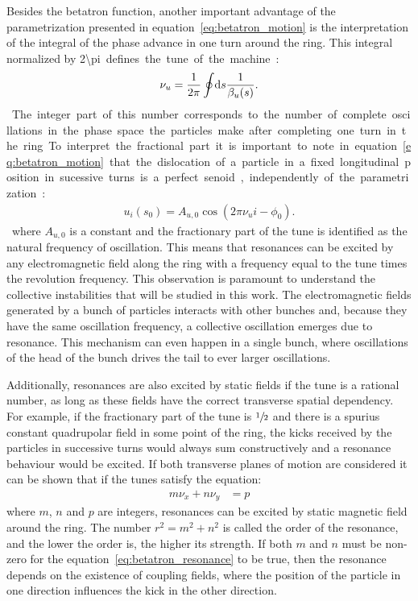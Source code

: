 	Besides the betatron function, another important advantage of the parametrization presented in equation~\eqref{eq:betatron_motion} is the interpretation of the integral of the phase advance in one turn around the ring. This integral normalized by \SI{2\pi} defines the tune of the machine:
	\begin{align}
		\nu_u = \frac{1}{2\pi}\oint\!\text{d}s \frac{1}{\beta_u(s)}.
	\end{align}
	The integer part of this number corresponds to the number of complete oscillations in the phase space the particles make after completing one turn in the ring. To interpret the fractional part it is important to note in equation~\eqref{eq:betatron_motion} that the dislocation of a particle in a fixed longitudinal position in sucessive turns is a perfect senoid, independently of the parametrization:
	\begin{align}
		u_i(s_0) = A_{u,0}\cos(2\pi\nu_u i -\phi_0).
	\end{align}
	where $A_{u,0}$ is a constant and the fractionary part of the tune is identified as the natural frequency of oscillation. This means that resonances can be excited by any electromagnetic field along the ring with a frequency equal to the tune times the revolution frequency. This observation is paramount to understand the collective instabilities that will be studied in this work. The electromagnetic fields generated by a bunch of particles interacts with other bunches and, because they have the same oscillation frequency, a collective oscillation emerges due to resonance. This mechanism can even happen in a single bunch, where oscillations of the head of the bunch drives the tail to ever larger oscillations.

	Additionally, resonances are also excited by static fields if the tune is a rational number, as long as these fields have the correct transverse spatial dependency. For example, if the fractionary part of the tune is $\sfrac12$ and there is a spurius constant quadrupolar field in some point of the ring, the kicks received by the particles in successive turns would always sum constructively and a resonance behaviour would be excited. If both transverse planes of motion are considered it can be shown that if the tunes satisfy the equation:
	\begin{align}\label{eq:betatron_resonance}
		m\nu_x + n\nu_y &= p
	\end{align}
	where $m$, $n$ and $p$ are integers, resonances can be excited by static magnetic field around the ring. The number $r^2 = m^2 + n^2$ is called the order of the resonance, and the lower the order is, the higher its strength. If both $m$ and $n$ must be non-zero for the equation~\eqref{eq:betatron_resonance} to be true, then the resonance depends on the existence of coupling fields, where the position of the particle in one direction influences the kick in the other direction.

